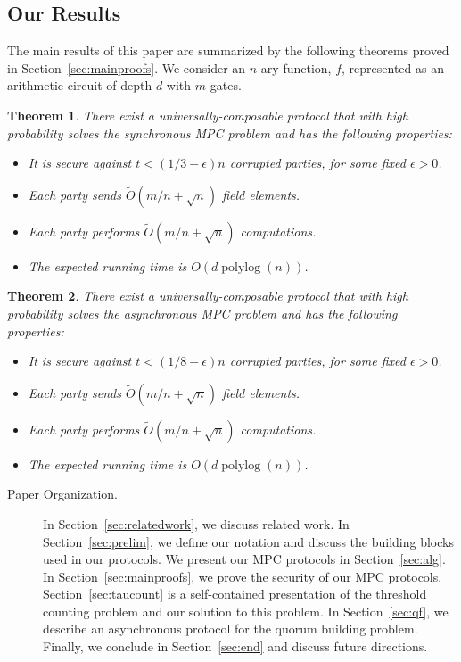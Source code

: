 \documentclass[11pt,letter]{article}
\DeclareMathOperator{\polylog}{polylog}
\theoremstyle{mytheoremstyle}
\newtheorem{theorem}{Theorem}
\begin{document}
\subsection{Our Results} \label{sec:results}
The main results of this paper are summarized by the following theorems proved in Section~\ref{sec:mainproofs}. We consider an $n$-ary function, $f$, represented as an arithmetic circuit of depth $d$ with $m$ gates. 

\begin{theorem} \label{thm:main-sync}
	There exist a universally-composable protocol that with high probability solves the synchronous MPC problem and has the following properties:
	\begin{itemize}
		\item It is secure against $t < (1/3-\epsilon)n$ corrupted parties, for some fixed $\epsilon>0$.
		\item Each party sends $\tilde{O}(m/n + \sqrt n)$ field elements.
		\item Each party performs $\tilde{O}(m/n + \sqrt n)$ computations.
		\item The expected running time is $O(d \polylog(n))$.
	\end{itemize}
\end{theorem}



\begin{theorem} \label{thm:main}
	There exist a universally-composable protocol that with high probability solves the asynchronous MPC problem and has the following properties:
	\begin{itemize}
		\item It is secure against $t < (1/8-\epsilon)n$ corrupted parties, for some fixed $\epsilon>0$.
		\item Each party sends $\tilde{O}(m/n + \sqrt n)$ field elements.
		\item Each party performs $\tilde{O}(m/n + \sqrt n)$ computations.
		\item The expected running time is $O(d \polylog(n))$.
	\end{itemize}
\end{theorem}

\begin{description}
\item[Paper Organization.]
In Section~\ref{sec:relatedwork}, we discuss related work. In Section~\ref{sec:prelim}, we define our notation and discuss the building blocks used in our protocols. We present our MPC protocols in Section~\ref{sec:alg}. In Section~\ref{sec:mainproofs}, we prove the security of our MPC protocols. Section~\ref{sec:taucount} is a self-contained presentation of the threshold counting problem and our solution to this problem. In Section~\ref{sec:qf}, we describe an asynchronous protocol for the quorum building problem. Finally, we conclude in Section~\ref{sec:end} and discuss future directions.
\end{description}
\end{document}
